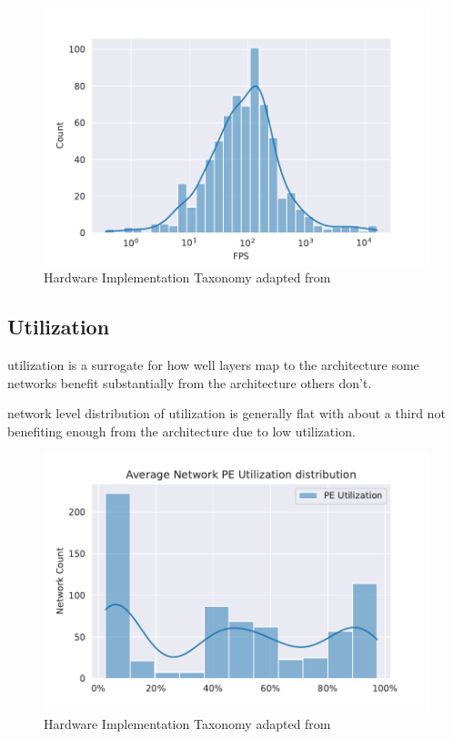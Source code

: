 \begin{figure}[ht]
    \centering
    \includegraphics[scale=0.58]{Plots/latency/fps.pdf}
    \caption{Hardware Implementation Taxonomy adapted from \cite{maestro}}
    \label{fig:hw_taxonomy}
\end{figure}


\subsection{Utilization}
\label{chap:hero:sim_platform:cigar_side}

utilization is a surrogate for how well layers map to the architecture
some networks benefit substantially from the architecture
others don't. 

network level distribution of utilization is generally flat with
about a third not benefiting enough from the architecture due to low
utilization. 


\begin{figure}[ht]
    \centering
    \includegraphics[scale=0.58]{Plots/utilization/network.pdf}
    \caption{Hardware Implementation Taxonomy adapted from \cite{maestro}}
    \label{fig:hw_taxonomy}
\end{figure}


